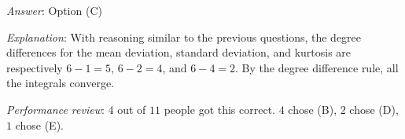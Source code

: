 \documentclass[10pt]{amsart}
\begin{document}
\begin{enumerate}
  {\em Answer}: Option (C)

  {\em Explanation}: With reasoning similar to the previous questions,
  the degree differences for the mean deviation, standard deviation,
  and kurtosis are respectively $6 - 1 = 5$, $6 - 2 = 4$, and $6 - 4 =
  2$. By the degree difference rule, all the integrals converge.

  {\em Performance review}: $4$ out of $11$ people got this
  correct. $4$ chose (B), $2$ chose (D), $1$ chose (E).
\end{enumerate}
\end{document}
